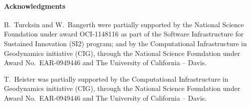 \documentclass{article}
\begin{document}
\paragraph*{Acknowledgments}
B.~Turcksin and W.~Bangerth were partially supported by the National Science
Foundation under award OCI-1148116 as part of the Software Infrastructure for
Sustained Innovation (SI2) program; and by the Computational
Infrastructure in Geodynamics initiative (CIG), through the National Science
Foundation under Award No.~EAR-0949446 and The University of California --
Davis.

T.~Heister was partially supported by the Computational
Infrastructure in Geodynamics initiative (CIG), through the National Science
Foundation under Award No.~EAR-0949446 and The University of California --
Davis.




\end{document}
